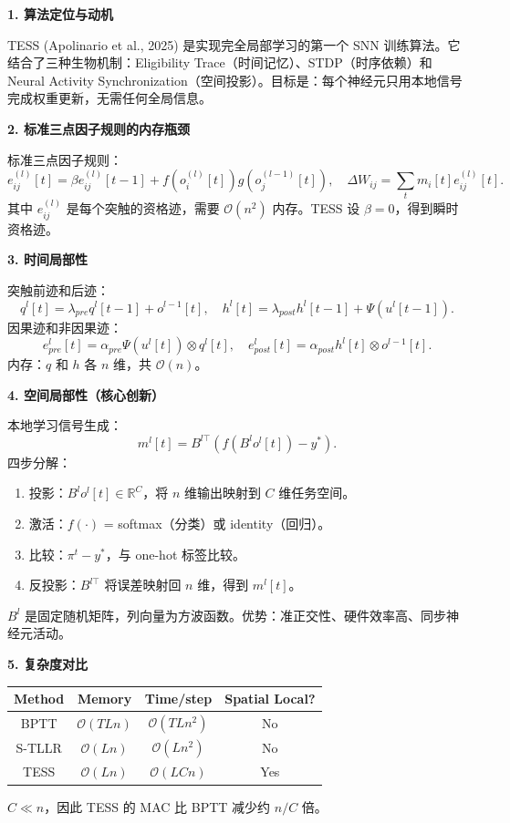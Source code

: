 \documentclass[journal,12pt,onecolumn]{IEEEtran}
\begin{document}
\medskip\noindent\textbf{1. 算法定位与动机}

TESS (Apolinario et al., 2025) 是实现完全局部学习的第一个 SNN 训练算法。它结合了三种生物机制：Eligibility Trace（时间记忆）、STDP（时序依赖）和 Neural Activity Synchronization（空间投影）。目标是：每个神经元只用本地信号完成权重更新，无需任何全局信息。

\medskip\noindent\textbf{2. 标准三点因子规则的内存瓶颈}

标准三点因子规则：
\[
e_{ij}^{(l)}[t] = \beta e_{ij}^{(l)}[t-1] + f(o_i^{(l)}[t])g(o_j^{(l-1)}[t]), \quad \Delta W_{ij} = \sum_t m_i[t] e_{ij}^{(l)}[t].
\]
其中 $e_{ij}^{(l)}$ 是每个突触的资格迹，需要 $\mathcal{O}(n^2)$ 内存。TESS 设 $\beta=0$，得到瞬时资格迹。

\medskip\noindent\textbf{3. 时间局部性}

突触前迹和后迹：
\[
q^l[t] = \lambda_{pre} q^l[t-1] + o^{l-1}[t], \quad h^l[t] = \lambda_{post} h^l[t-1] + \Psi(u^l[t-1]).
\]
因果迹和非因果迹：
\[
e_{pre}^l[t] = \alpha_{pre}\Psi(u^l[t]) \otimes q^l[t], \quad e_{post}^l[t] = \alpha_{post} h^l[t] \otimes o^{l-1}[t].
\]
内存：$q$ 和 $h$ 各 $n$ 维，共 $\mathcal{O}(n)$。

\medskip\noindent\textbf{4. 空间局部性（核心创新）}

本地学习信号生成：
\[
m^l[t] = B^{l\top} \left( f(B^l o^l[t]) - y^* \right). \tag{9}
\]
四步分解：
\begin{enumerate}
    \item 投影：$B^l o^l[t] \in \mathbb{R}^C$，将 $n$ 维输出映射到 $C$ 维任务空间。
    \item 激活：$f(\cdot)$ = softmax（分类）或 identity（回归）。
    \item 比较：$\pi^t - y^*$，与 one-hot 标签比较。
    \item 反投影：$B^{l\top}$ 将误差映射回 $n$ 维，得到 $m^l[t]$。
\end{enumerate}

$B^l$ 是固定随机矩阵，列向量为方波函数。优势：准正交性、硬件效率高、同步神经元活动。

\medskip\noindent\textbf{5. 复杂度对比}

\begin{table}[h]
\centering
\begin{tabular}{c|c|c|c}
    \toprule
    Method & Memory & Time/step & Spatial Local? \\
    \midrule
    BPTT & $\mathcal{O}(TLn)$ & $\mathcal{O}(TLn^2)$ & No \\
    S-TLLR & $\mathcal{O}(Ln)$ & $\mathcal{O}(Ln^2)$ & No \\
    TESS & $\mathcal{O}(Ln)$ & $\mathcal{O}(LCn)$ & Yes \\
    \bottomrule
\end{tabular}
\end{table}
$C \ll n$，因此 TESS 的 MAC 比 BPTT 减少约 $n/C$ 倍。
\end{document}
